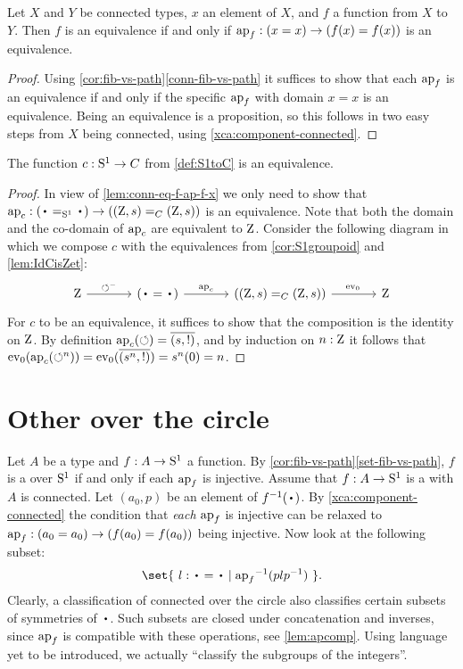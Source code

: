 \begin{lemma}\label{lem:conn-eq-f-ap-f-x}
Let $X$ and $Y$ be connected types, $x$ an element of $X$,
and $f$ a function from $X$ to $Y$. Then $f$ is an equivalence
if and only if $\ap{f}: (x=x) \to (f(x)=f(x))$ is an equivalence.
\end{lemma} 
\begin{proof}
Using \cref{cor:fib-vs-path}\ref{conn-fib-vs-path} it suffices to show that 
each $\ap{f}$ is an equivalence if and only if the specific $\ap{f}$ with 
domain $x=x$ is an equivalence. Being an equivalence is a proposition, 
so this follows in two easy steps from $X$ being connected,
using \cref{xca:component-connected}.
\end{proof}

\begin{theorem}\label{thm:S1bysymmetries}
  The function $c:{\mathrm{S}^1}\to C$ from \cref{def:S1toC} is an equivalence.
\end{theorem}
\begin{proof}
  In view of \cref{lem:conn-eq-f-ap-f-x} we only need to show that 
$\ap{c}:(\base=_{\Sc}\base)\to((\zet,\etop{s})=_C(\zet,\etop{s}))$ is an equivalence.
Note that both the domain and the co-domain of $\ap{c}$ are equivalent to $\mathrm{Z}$.
Consider the following diagram in which we compose $c$ with the equivalences
from \cref{cor:S1groupoid} and \cref{lem:IdCisZet}:
\[
  \begin{tikzcd}[column sep=large]
    \zet\ar[r,"\Sloop^-"] &
    (\base=\base)\ar[r,"\ap{c}"] &
    ((\zet,\etop{s})=_C(\zet,\etop{s}))\ar[r,"\ev_0\vphantom{\ap{c}}"] &
    \zet
  \end{tikzcd}
\]
For $c$ to be an equivalence, it suffices to show that the composition
is the identity on $\mathrm{Z}$. By definition $\ap{c}(\Sloop) = \pathpair{\etop{s}}{!}$, 
and by induction on $n:\mathrm{Z}$ it follows that
$\ev_0(\ap{c}(\Sloop^n))=\ev_0(\pathpair{\etop{s}^n}{!}) = s^n(0) = n$.
\end{proof}

\section{Other \coverings over the circle}
\label{sec:covS1}

Let $A$ be a type and $f:A\to {\mathrm{S}^1}$ a function.
By \cref{cor:fib-vs-path}\ref{set-fib-vs-path}, $f$ is a \covering
over ${\mathrm{S}^1}$ if and only if each $\ap{f}$ is injective.
Assume that $f:A\to {\mathrm{S}^1}$ is a \covering with $A$ is connected.
Let $(a_0,p)$ be an element of $f^{-1}(\base)$. 
By \cref{xca:component-connected}
the condition that \emph{each} $\ap{f}$ is injective
can be relaxed to $\ap{f}: (a_0=a_0)\to(f(a_0)=f(a_0))$ being injective.
Now look at the following subset:
\[
\set{~ l: \base = \base \mid {\ap{f}}^{-1}(plp^{-1})~ }.
\]
Clearly, a classification of connected \coverings over the circle
also classifies certain subsets of symmetries of $\base$.
Such subsets are closed under concatenation and inverses,
since $\ap{f}$ is compatible with these operations,
see \cref{lem:apcomp}.
Using language yet to be introduced, we actually ``classify the subgroups of the integers''.

